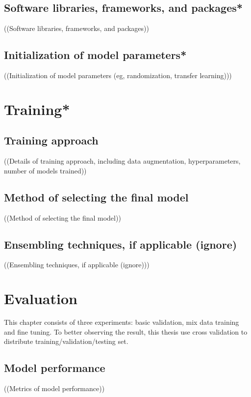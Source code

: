 \subsection{Software libraries, frameworks, and packages*}
((Software libraries, frameworks, and packages)) \\
\subsection{Initialization of model parameters*}
((Initialization of model parameters (eg, randomization, transfer learning))) \\



\section{Training*}
\subsection{Training approach}
((Details of training approach, including data augmentation, hyperparameters, number of models trained)) \\
\subsection{Method of selecting the final model}
((Method of selecting the final model)) \\
\subsection{Ensembling techniques, if applicable (ignore)}
((Ensembling techniques, if applicable (ignore))) \\

\section{Evaluation}
This chapter consists of three experiments: basic validation, mix data training and fine tuning. To better observing the result, this thesis use cross validation to distribute training/validation/testing set. 


\subsection{Model performance}
((Metrics of model performance)) \\

